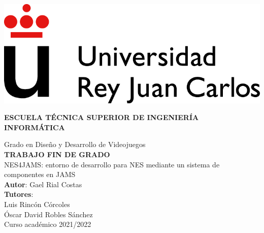 \thispagestyle{empty}

\begin{center}
	\includegraphics{images/URJC_logo}
	\vspace{2cm}

	\large{\textbf{ESCUELA TÉCNICA SUPERIOR DE INGENIERÍA INFORMÁTICA}}
	\vspace{5mm}

 	{\Large {Grado en Diseño y Desarrollo de Videojuegos}}
    \\
  	\vspace{34mm}
	{\large {\bf TRABAJO FIN DE GRADO}}
  	\vspace{10mm}
    \\
  	{\Large {{\Huge {
		NES4JAMS: entorno de desarrollo para NES mediante un sistema de componentes en JAMS
	}} \\[1cm] }}
  	\vspace{2cm}
	{\large {
		\textbf{Autor}: Gael Rial Costas\\
		\textbf{Tutores}:\\
		Luis Rincón Córcoles\\
		Óscar David Robles Sánchez\\
	}}
	\vspace{10mm}
  	{\large {Curso académico 2021/2022}}
  	\vspace{1cm}
\end{center}

